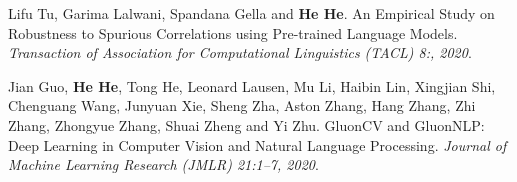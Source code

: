 Lifu Tu, Garima Lalwani, Spandana Gella and \textbf{He He}. An Empirical Study on Robustness to Spurious Correlations using Pre-trained Language Models. \textit{Transaction of Association for Computational Linguistics (TACL) 8:, 2020}.

Jian Guo, \textbf{He He}, Tong He, Leonard Lausen, Mu Li, Haibin Lin, Xingjian Shi, Chenguang Wang, Junyuan Xie, Sheng Zha, Aston Zhang, Hang Zhang, Zhi Zhang, Zhongyue Zhang, Shuai Zheng and Yi Zhu. GluonCV and GluonNLP: Deep Learning in Computer Vision and Natural Language Processing. \textit{Journal of Machine Learning Research (JMLR) 21:1--7, 2020}.

